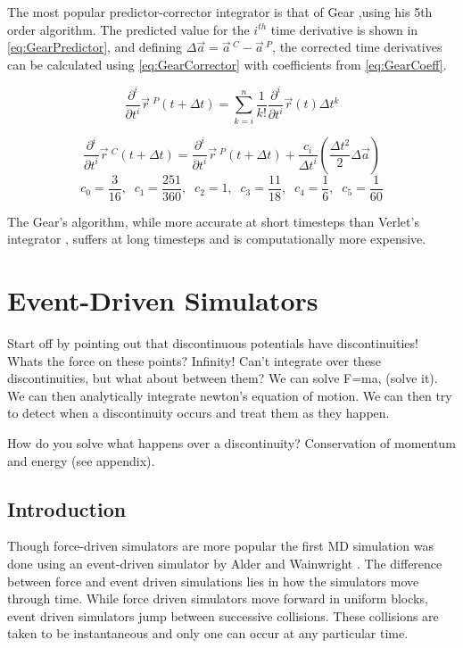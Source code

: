 \message{ !name(main.tex)}\documentclass[12pt]{UoAthesis}
\begin{document}
The most popular predictor-corrector integrator is that of Gear
\cite{Gear1971},using his 5th order algorithm. The predicted value for
the $i^{th}$ time derivative is shown in \eqref{eq:GearPredictor}, and
defining $\Delta \vec{a} = \vec{a}\,^{C} - \vec{a}\,^{P}$, the
corrected time derivatives can be calculated using
\eqref{eq:GearCorrector} with coefficients from \eqref{eq:GearCoeff}.

\begin{equation} 
  \frac{\partial^{i}}{\partial t^{i}} \vec{r}\:^{P}(t+\Delta t)
  =\sum^{n}_{k=i} \frac{1}{k!}\frac{\partial^{i} }{\partial t^{i}}
  \vec{r}(t) \Delta t^{k} 
  \label{eq:GearPredictor} 
\end{equation}

\begin{equation} 
  \frac{\partial^{i}}{\partial t^{i}} \vec{r}\:^{C}(t+\Delta t)
  =\frac{\partial^{i} }{\partial t^{i}} \vec{r}\:^{P}(t+\Delta t)
  +\frac{c_i}{\Delta t^i} \left(\frac{\Delta t^2}{2}\Delta \vec{a}\right)
  \label{eq:GearCorrector} \end{equation} \begin{equation} c_0 =
  \frac{3}{16},\;\;c_1 = \frac{251}{360},\;\; c_2 = 1,\;\; c_3 =
  \frac{11}{18},\;\; c_4 =
  \frac{1}{6},\;\; c_5 = \frac{1}{60} \label{eq:GearCoeff} 
\end{equation}

The Gear's algorithm, while more accurate at short timesteps than Verlet's
integrator \cite{Haile1997}, suffers at long timesteps and is computationally
more expensive.
\newpage
\section{Event-Driven Simulators} 
Start off by pointing out that discontinuous potentials have
discontinuities! Whats the force on these points? Infinity! Can't
integrate over these discontinuities, but what about between them? We
can solve F=ma, (solve it). We can then analytically integrate
newton's equation of motion. We can then try to detect when a
discontinuity occurs and treat them as they happen.

How do you solve what happens over a discontinuity? Conservation of
momentum and energy (see appendix).

\subsection{Introduction} 
Though force-driven simulators are more popular the first MD
simulation was done using an event-driven simulator by Alder and
Wainwright \cite{Alder1959}. The difference between force and event
driven simulations lies in how the simulators move through time.
While force driven simulators move forward in uniform blocks, event
driven simulators jump between successive collisions.  These
collisions are taken to be instantaneous and only one can occur at any
particular time.
\end{document}
